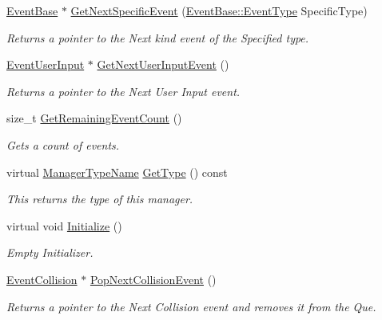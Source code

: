 \begin{DoxyCompactItemize}
\hyperlink{classphys_1_1EventBase}{EventBase} $\ast$ \hyperlink{classphys_1_1EventManager_a7340cfab326856cf4ebc653b11101016}{GetNextSpecificEvent} (\hyperlink{classphys_1_1EventBase_a5e6a8564e127f654123f0bf6a2751923}{EventBase::EventType} SpecificType)
\begin{DoxyCompactList}\small\item\em Returns a pointer to the Next kind event of the Specified type. \item\end{DoxyCompactList}\item 
\hyperlink{classphys_1_1EventUserInput}{EventUserInput} $\ast$ \hyperlink{classphys_1_1EventManager_a38b42602a3a4d621048c78b525b4db49}{GetNextUserInputEvent} ()
\begin{DoxyCompactList}\small\item\em Returns a pointer to the Next User Input event. \item\end{DoxyCompactList}\item 
size\_\-t \hyperlink{classphys_1_1EventManager_af3e02562344e4de9c40d91446acd84dc}{GetRemainingEventCount} ()
\begin{DoxyCompactList}\small\item\em Gets a count of events. \item\end{DoxyCompactList}\item 
virtual \hyperlink{classphys_1_1ManagerBase_aaa6ccddf23892eaccb898529414f80a5}{ManagerTypeName} \hyperlink{classphys_1_1EventManager_a194890f7f8be5d45aa98623481482696}{GetType} () const 
\begin{DoxyCompactList}\small\item\em This returns the type of this manager. \item\end{DoxyCompactList}\item 
virtual void \hyperlink{classphys_1_1EventManager_a51afdd83f44f461dfac5c9eca5883ea0}{Initialize} ()
\begin{DoxyCompactList}\small\item\em Empty Initializer. \item\end{DoxyCompactList}\item 
\hyperlink{classphys_1_1EventCollision}{EventCollision} $\ast$ \hyperlink{classphys_1_1EventManager_a6a6ae165032e429c12653565590040cd}{PopNextCollisionEvent} ()
\begin{DoxyCompactList}\small\item\em Returns a pointer to the Next Collision event and removes it from the Que. \item\end{DoxyCompactList}\item 

\end{DoxyCompactItemize}
